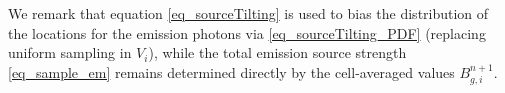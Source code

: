 \documentclass[preprint,12pt]{elsarticle}
\theoremstyle{definition}
\theoremstyle{plain}
\numberwithin{equation}{section}
\numberwithin{algorithm}{section}
\newcounter{eq_count}
\newcommand{\vOmega}{\mathbf{\Omega}}
\newcommand{\vx}{\mathbf{x}}
\newcommand{\mfx}{{\mathbf{X}}}
\newcommand{\dd}{{\text{d}}}
\begin{document}
We remark that equation \eqref{eq_sourceTilting} is used to bias the distribution of the locations for the emission photons via \eqref{eq_sourceTilting_PDF} (replacing uniform sampling in $V_i$), while the total emission source strength \eqref{eq_sample_em} remains determined directly by the cell-averaged values $B_{g,i}^{n+1}$.


\end{document}
